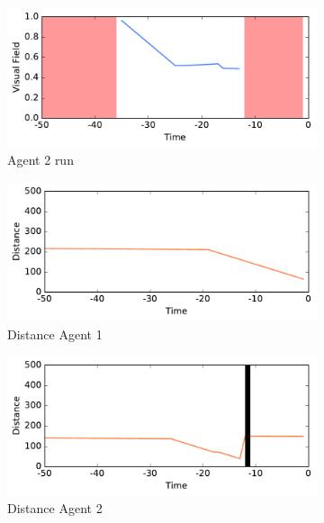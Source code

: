 \documentclass[a4paper,twoside]{article}
\begin{document}
\begin{figure}
\begin{subfigure}{.49\columnwidth}
	\center
	\includegraphics[width=.98\columnwidth]{img/1_235.pdf}
	\caption{Agent 2 run}
	\label{fig:experiment:pos2}
\end{subfigure}
\begin{subfigure}{.49\columnwidth}
	\center
	\includegraphics[width=.98\columnwidth]{img/4_139.pdf}
	\caption{Distance Agent 1}
	\label{fig:experiment:distance1}
\end{subfigure}
\begin{subfigure}{.49\columnwidth}
	\center
	\includegraphics[width=.98\columnwidth]{img/4_235.pdf}
	\caption{Distance Agent 2}
	\label{fig:experiment:distance2}
\end{subfigure}
\begin{subfigure}{.49\columnwidth}
	\center

\end{subfigure}
\end{figure}
\end{document}
